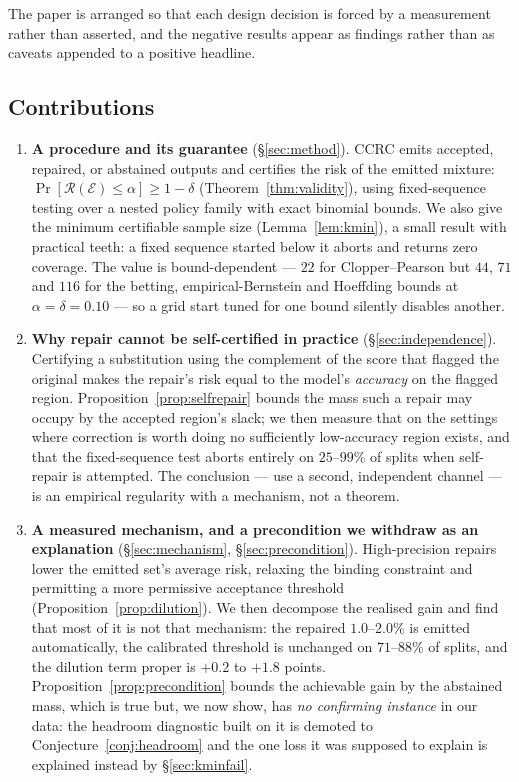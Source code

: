 \documentclass[review,number,doubleblind]{elsarticle}
\theoremstyle{plain}
\theoremstyle{definition}
\theoremstyle{remark}
\newcommand{\Risk}{\mathcal{R}}
\newcommand{\emit}{\mathcal{E}}
\begin{document}
\medskip
The paper is arranged so that each design decision is forced by a measurement rather than
asserted, and the negative results appear as findings rather than as caveats appended to a
positive headline.

\subsection{Contributions}
\begin{enumerate}
\item \textbf{A procedure and its guarantee} (\S\ref{sec:method}). CCRC emits accepted,
repaired, or abstained outputs and certifies the risk of the emitted mixture:
$\Pr[\Risk(\emit)\le\alpha]\ge1-\delta$ (Theorem~\ref{thm:validity}), using
fixed-sequence testing over a nested policy family with exact binomial bounds. We also
give the minimum certifiable sample size (Lemma~\ref{lem:kmin}), a small result with
practical teeth: a fixed sequence started below it aborts and returns zero coverage. The
value is bound-dependent --- $22$ for Clopper--Pearson but $44$, $71$ and $116$ for the
betting, empirical-Bernstein and Hoeffding bounds at $\alpha=\delta=0.10$ --- so a grid start
tuned for one bound silently disables another.

\item \textbf{Why repair cannot be self-certified in practice}
(\S\ref{sec:independence}). Certifying a substitution using the complement of the score
that flagged the original makes the repair's risk equal to the model's \emph{accuracy} on
the flagged region. Proposition~\ref{prop:selfrepair} bounds the mass such a repair may
occupy by the accepted region's slack; we then measure that on the settings where
correction is worth doing no sufficiently low-accuracy region exists, and that the
fixed-sequence test aborts entirely on $25$--$99\%$ of splits when self-repair is
attempted. The conclusion --- use a second, independent channel --- is an empirical
regularity with a mechanism, not a theorem.

\item \textbf{A measured mechanism, and a precondition we withdraw as an explanation}
(\S\ref{sec:mechanism}, \S\ref{sec:precondition}). High-precision repairs lower the emitted
set's average risk, relaxing the binding constraint and permitting a more permissive
acceptance threshold (Proposition~\ref{prop:dilution}). We then decompose the realised gain
and find that most of it is not that mechanism: the repaired $1.0$--$2.0\%$ is emitted
automatically, the calibrated threshold is unchanged on $71$--$88\%$ of splits, and the
dilution term proper is $+0.2$ to $+1.8$ points. Proposition~\ref{prop:precondition} bounds
the achievable gain by the abstained mass, which is true but, we now show, has \emph{no
confirming instance} in our data: the headroom diagnostic built on it is demoted to
Conjecture~\ref{conj:headroom} and the one loss it was supposed to explain is explained
instead by \S\ref{sec:kminfail}.


\end{enumerate}
\end{document}
